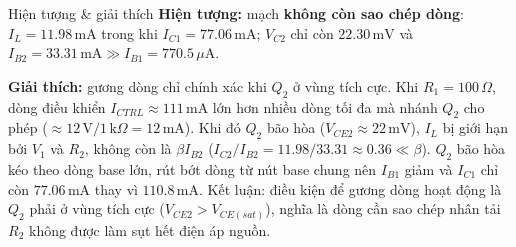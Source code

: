 \begin{notebox}{Hiện tượng \& giải thích}
\textbf{Hiện tượng:} mạch \textbf{không còn sao chép dòng}: $I_L = 11.98\,\text{mA}$ trong khi $I_{C1} = 77.06\,\text{mA}$; $V_{C2}$ chỉ còn $22.30\,\text{mV}$ và $I_{B2} = 33.31\,\text{mA} \gg I_{B1} = 770.5\,\mu\text{A}$.

\textbf{Giải thích:} gương dòng chỉ chính xác khi $Q_2$ ở vùng tích cực. Khi $R_1 = 100\,\Omega$, dòng điều khiển $I_{CTRL} \approx 111\,\text{mA}$ lớn hơn nhiều dòng tối đa mà nhánh $Q_2$ cho phép ($\approx 12\,\text{V}/1\,\text{k}\Omega = 12\,\text{mA}$). Khi đó $Q_2$ bão hòa ($V_{CE2} \approx 22\,\text{mV}$), $I_L$ bị giới hạn bởi $V_1$ và $R_2$, không còn là $\beta I_{B2}$ ($I_{C2}/I_{B2} = 11.98/33.31 \approx 0.36 \ll \beta$). $Q_2$ bão hòa kéo theo dòng base lớn, rút bớt dòng từ nút base chung nên $I_{B1}$ giảm và $I_{C1}$ chỉ còn $77.06\,\text{mA}$ thay vì $110.8\,\text{mA}$. Kết luận: điều kiện để gương dòng hoạt động là $Q_2$ phải ở vùng tích cực ($V_{CE2} > V_{CE(sat)}$), nghĩa là dòng cần sao chép nhân tải $R_2$ không được làm sụt hết điện áp nguồn.
\end{notebox}
